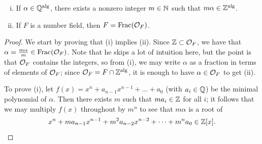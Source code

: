 \begin{lemma} \label{lem:field_of_fractions}
    \begin{enumerate}[(i)]
        \item If $\alpha \in \operatorname{\mathbb Q^{\operatorname{alg}}}$, there exists a nonzero integer $m \in \mathbb N$ such that $m\alpha \in \operatorname{\mathbb Z^{\operatorname{alg}}}$.
        \item If $F$ is a number field, then $F = \operatorname{Frac}(\mathcal O_F)$.
    \end{enumerate}
\end{lemma}
\begin{proof}
    We start by proving that (i) implies (ii). Since $\mathbb Z \subset \mathcal O_F$, we have that $\alpha = \frac{m \alpha}{m} \in \operatorname{Frac}(\mathcal O_F)$. {\color{airforceblue} Note that he skips a lot of intuition here, but the point is that $\mathcal O_F$ contains the integers, so from (i), we may write $\alpha$ as a fraction in terms of elements of $\mathcal O_F$; since $\mathcal O_F = F \cap \operatorname{\mathbb Z^{\operatorname{alg}}}$, it is enough to have $\alpha \in \mathcal O_F$ to get (ii).}

    To prove (i), let $f(x) = x^n + a_{n-1} x^{n-1} + \dots + a_0$ (with $a_i \in \mathbb Q$) be the minimal polynomial of $\alpha$. Then there exists $m$ such that $m a_i \in \mathbb Z$ for all $i$; it follows that we may multiply $f(x)$ throughout by $m^n$ to see that $m \alpha$ is a root of
    \[ x^n + m a_{n-1} x^{n-1} + m^2 a_{n-2} x^{n-2} + \dots + m^n a_0 \in \mathbb Z[x]. \qedhere \]
\end{proof} \vspace{-8pt}

